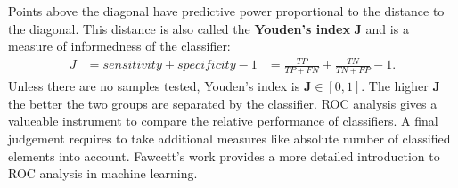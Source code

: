 Points above the diagonal have predictive power proportional to the distance to the diagonal.
This distance is also called the \textbf{Youden's index} $\mathbf{J}$\cite{youden_cancer1950} and is a measure of informedness of the classifier:
\begin{equation}
\begin{aligned}
    J &= sensitivity + specificity - 1
      &= \frac{TP}{TP + FN} + \frac{TN}{TN + FP} - 1\text{.}
\end{aligned}
\label{eq:youden}
\end{equation}
Unless there are no samples tested, Youden's index is $\mathbf{J} \in [0, 1]$.
The higher $\mathbf{J}$ the better the two groups are separated by the classifier.
\acrshort{ROC} analysis gives a valueable instrument to compare the relative performance of classifiers.
A final judgement requires to take additional measures like absolute number of classified elements into account.
Fawcett's\cite{fawcett_2006} work provides a more detailed introduction to \acrshort{ROC} analysis in machine learning.

